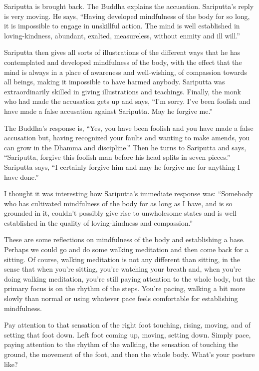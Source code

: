 Sariputta is brought back. The Buddha explains the accusation.
Sariputta’s reply is very moving. He says, “Having developed mindfulness
of the body for so long, it is impossible to engage in unskillful
action. The mind is well established in loving-kindness, abundant,
exalted, measureless, without enmity and ill will.”

Sariputta then gives all sorts of illustrations of the different ways
that he has contemplated and developed mindfulness of the body, with the
effect that the mind is always in a place of awareness and well-wishing,
of compassion towards all beings, making it impossible to have harmed
anybody. Sariputta was extraordinarily skilled in giving illustrations
and teachings. Finally, the monk who had made the accusation gets up and
says, “I’m sorry. I’ve been foolish and have made a false accusation
against Sariputta. May he forgive me.”

The Buddha’s response is, “Yes, you have been foolish and you have made
a false accusation but, having recognized your faults and wanting to
make amends, you can grow in the Dhamma and discipline.” Then he turns
to Sariputta and says, “Sariputta, forgive this foolish man before his
head splits in seven pieces.” Sariputta says, “I certainly forgive him
and may he forgive me for anything I have done.”

I thought it was interesting how Sariputta’s immediate response was:
“Somebody who has cultivated mindfulness of the body for as long as I
have, and is so grounded in it, couldn’t possibly give rise to
unwholesome states and is well established in the quality of
loving-kindness and compassion.”

These are some reflections on mindfulness of the body and establishing a
base. Perhaps we could go and do some walking meditation and then come
back for a sitting. Of course, walking meditation is not any different
than sitting, in the sense that when you’re sitting, you’re watching
your breath and, when you’re doing walking meditation, you’re still
paying attention to the whole body, but the primary focus is on the
rhythm of the steps. You’re pacing, walking a bit more slowly than
normal or using whatever pace feels comfortable for establishing
mindfulness.

Pay attention to that sensation of the right foot touching, rising,
moving, and of setting that foot down. Left foot coming up, moving,
setting down. Simply pace, paying attention to the rhythm of the
walking, the sensation of touching the ground, the movement of the foot,
and then the whole body. What’s your posture like?

